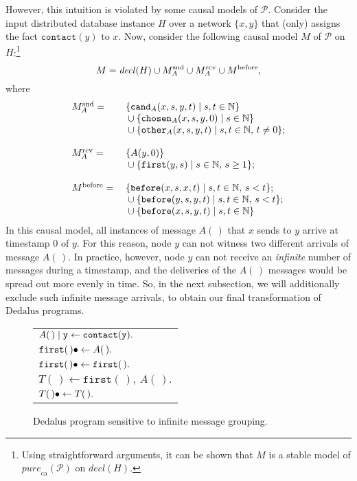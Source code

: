\documentclass{tlp}
\newenvironment{cenchop}{\renewcommand{\arraystretch}{1.3}\begin{center}\begin{tabular}{l}}{\end{tabular}\end{center}\renewcommand{\arraystretch}{1}}
\newcommand{\qsp}{\\[1.2ex]}
\newcommand{\langname}[1]{\text{#1}}  \newcommand{\pred}[1]{\mathtt{#1}}  \newcommand{\fname}[1]{\mathit{#1}}  \newcommand{\sq}[1]{`{#1}'}
\newcommand{\dedalus}{\langname{Dedalus}}
\newcommand{\Nat}{\mathbb{N}}  \newcommand{\len}[1]{|#1|} \newcommand{\rom}[1]{\text{\emph{(#1)}}} \newcommand{\romI}{\rom i}
\newcommand{\ded}{\mathcal{P}}
\newcommand{\ntup}{(\,)}
\newcommand{\var}[1]{\mathtt{#1}}
\newcommand{\before}{\pred{before}}
\newcommand{\chosen}{\pred{chosen}}
\newcommand{\other}{\pred{other}}
\newcommand{\cand}{\pred{cand}}
\newcommand{\decl}[1]{\fname{decl}(#1)}
\newcommand{\purecaus}[1]{\fname{pure}_{\mathrm{ca}}(#1)}
\begin{document}
However, this intuition is violated by some causal models of $\ded$.
Consider the input distributed database instance $H$ over a network
$\{x,y\}$ that (only) assigns the fact $\pred{contact}(y)$ to $x$.
Now, consider the following causal model $M$ of $\ded$ on $H$:\footnote{Using straightforward arguments, it can be shown that $M$ is a stable
model of $\purecaus{\ded}$ on $\decl H$.}
\[
M=\decl H\cup M_{A}^{\lsnd}\cup M_{A}^{\lrcv}\cup M^{\lbefore},
\]
where 
    \[
    \begin{array}{ll}
    M_A^\lsnd = {} & \{\cand_A(x,s,y,t)\mid s,t\in\Nat\} \\
                & {}\cup \{\chosen_A(x,s,y,0)\mid s\in\Nat\} \\
                & {}\cup \{\other_A(x,s,y,t)\mid s,t\in\Nat,\, t\neq 0\};\\
    \\
    M_A^\lrcv = {} & \{A(y,0)\} \\
                & {}\cup \{\pred{first}(y,s) \mid s\in\Nat,\, s\geq 1\}; \\
    \\
    M^\lbefore = {} & \{\before(x,s,x,t) \mid s,t\in\Nat,\, s<t\};\\                 
                 & {}\cup \{\before(y,s,y,t) \mid s,t\in\Nat,\, s<t\};\\
                 & {}\cup \{\before(x,s,y,t) \mid s,t\in\Nat\}
    \end{array}
    \]    
In this causal model, all instances
of message $A\ntup$ that $x$ sends to $y$ arrive at timestamp $0$
of $y$. For this reason, node $y$ can not witness two different
arrivals of message $A\ntup$.  In practice, however, node $y$ can
not receive an \emph{infinite} number of messages during a timestamp,
and the deliveries of the $A\ntup$ messages would be spread out more
evenly in time. So, in the next subsection, we will additionally exclude
such infinite message arrivals, to obtain our final transformation
of $\dedalus$ programs.

\begin{figure}
\begin{framed}
\begin{cenchop}

$A\ntup\sugas{\var y}\gets\pred{contact}(\var y).$\qsp

$\pred{first}\ntup\sugind\gets A\ntup.$\\

$\pred{first}\ntup\sugind\gets\pred{first}\ntup.$\qsp

$T\ntup\gets\pred{first}\ntup,\, A\ntup.$\\

$T\ntup\sugind\gets T\ntup.$

\end{cenchop}
\end{framed}

\caption{$\dedalus$ program sensitive to infinite message grouping.}

\label{fig:message-heaping}

\end{figure}
\end{document}
